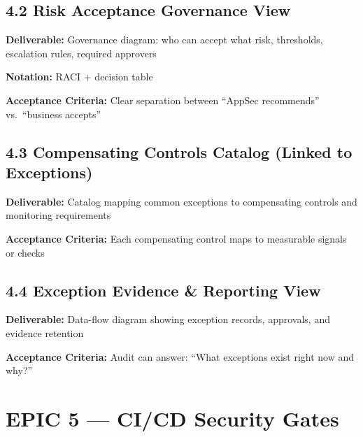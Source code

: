 \documentclass[11pt,letterpaper]{article}
\newcommand{\storyfield}[2]{\textbf{#1:} #2}
\begin{document}
\subsection{4.2 Risk Acceptance Governance View}

\begin{storycard}
\storyfield{Deliverable}{Governance diagram: who can accept what risk, thresholds, escalation rules, required approvers}

\storyfield{Notation}{RACI + decision table}

\storyfield{Acceptance Criteria}{Clear separation between ``AppSec recommends'' vs.\ ``business accepts''}
\end{storycard}

\subsection{4.3 Compensating Controls Catalog (Linked to Exceptions)}

\begin{storycard}
\storyfield{Deliverable}{Catalog mapping common exceptions to compensating controls and monitoring requirements}

\storyfield{Acceptance Criteria}{Each compensating control maps to measurable signals or checks}
\end{storycard}

\subsection{4.4 Exception Evidence \& Reporting View}

\begin{storycard}
\storyfield{Deliverable}{Data-flow diagram showing exception records, approvals, and evidence retention}

\storyfield{Acceptance Criteria}{Audit can answer: ``What exceptions exist right now and why?''}
\end{storycard}

\newpage

\section{EPIC 5 --- CI/CD Security Gates}
\end{document}
